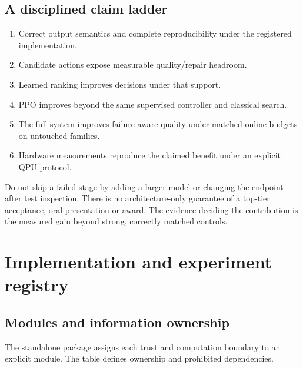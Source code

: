 \documentclass[11pt,a4paper]{article}
\theoremstyle{definition}\newtheorem{definition}[proposition]{Definition}
\begin{document}
\subsection{A disciplined claim ladder}
\begin{enumerate}
\item Correct output semantics and complete reproducibility under the registered implementation.
\item Candidate actions expose measurable quality/repair headroom.
\item Learned ranking improves decisions under that support.
\item PPO improves beyond the same supervised controller and classical search.
\item The full system improves failure-aware quality under matched online budgets on untouched families.
\item Hardware measurements reproduce the claimed benefit under an explicit QPU protocol.
\end{enumerate}
Do not skip a failed stage by adding a larger model or changing the endpoint after test inspection. There is no architecture-only guarantee of a top-tier acceptance, oral presentation or award. The evidence deciding the contribution is the measured gain beyond strong, correctly matched controls.
 \section{Implementation and experiment registry}\label{sec:implementation}
\subsection{Modules and information ownership}
The standalone package assigns each trust and computation boundary to an explicit module. The table defines ownership and prohibited dependencies.
\end{document}

